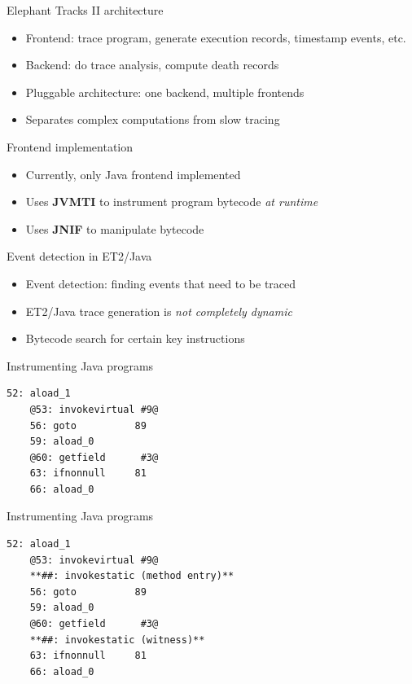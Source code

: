 \documentclass[11pt]{beamer}
\begin{document}
\begin{frame}{Elephant Tracks II architecture}
  \begin{itemize}
  \item Frontend: trace program, generate execution records, timestamp events, etc.
    \pause
  \item Backend: do trace analysis, compute death records
    \pause
  \item Pluggable architecture: one backend, multiple frontends
  \item Separates complex computations from slow tracing
  \end{itemize}
\end{frame}

\begin{frame}{Frontend implementation}
  \begin{itemize}
  \item Currently, only Java frontend implemented
  \item Uses \textbf{JVMTI} to instrument program bytecode \emph{at runtime}
  \item Uses \textbf{JNIF} \citep{JNIF} to manipulate bytecode
  \end{itemize}
\end{frame}

\begin{frame}{Event detection in ET2/Java}
  \begin{itemize}
  \item Event detection: finding events that need to be traced
    \pause
  \item ET2/Java trace generation is \emph{not completely dynamic}
    \pause
  \item Bytecode search for certain key instructions
  \end{itemize}
\end{frame}

\begin{frame}[fragile]{Instrumenting Java programs}
  \begin{lstlisting}[language=jvmis, style=base]
    52: aload_1
    @53: invokevirtual #9@
    56: goto          89
    59: aload_0
    @60: getfield      #3@
    63: ifnonnull     81
    66: aload_0
  \end{lstlisting}
\end{frame}

\begin{frame}[fragile]{Instrumenting Java programs}
  \begin{lstlisting}[language=jvmis, style=base]
    52: aload_1
    @53: invokevirtual #9@
    **##: invokestatic (method entry)**
    56: goto          89
    59: aload_0
    @60: getfield      #3@
    **##: invokestatic (witness)**
    63: ifnonnull     81
    66: aload_0
  \end{lstlisting}
\end{frame}
\end{document}
